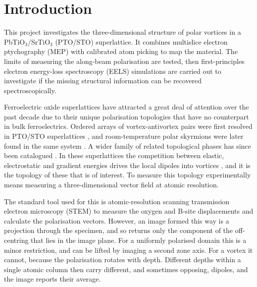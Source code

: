 \documentclass[aps,prb,twocolumn,superscriptaddress,floatfix,nofootinbib]{revtex4-2}
\begin{document}
\section{Introduction}

This project investigates the three-dimensional structure of polar vortices in a PbTiO$_3$/SrTiO$_3$ (PTO/STO) superlattice. It combines multislice electron ptychography (MEP) with calibrated atom picking to map the material. The limits of measuring the along-beam polarisation are tested, then first-principles electron energy-loss spectroscopy (EELS) simulations are carried out to investigate if the missing structural information can be recovered spectroscopically.

Ferroelectric oxide superlattices have attracted a great deal of attention over the past decade due to their unique polarisation topologies that have no counterpart in bulk ferroelectrics. Ordered arrays of vortex-antivortex pairs were first resolved in PTO/STO superlattices \citep{Yadav2016}, and room-temperature polar skyrmions were later found in the same system \citep{Das2019}. A wider family of related topological phases has since been catalogued \citep{Junquera2023}. In these superlattices the competition between elastic, electrostatic and gradient energies drives the local dipoles into vortices \citep{Junquera2023}, and it is the topology of these that is of interest. To measure this topology experimentally means measuring a three-dimensional vector field at atomic resolution.

The standard tool used for this is atomic-resolution scanning transmission electron microscopy (STEM) to measure the oxygen and B-site displacements and calculate the polarisation vectors. However, an image formed this way is a projection through the specimen, and so returns only the component of the off-centring that lies in the image plane. For a uniformly polarised domain this is a minor restriction, and can be lifted by imaging a second zone axis. For a vortex it cannot, because the polarisation rotates with depth. Different depths within a single atomic column then carry different, and sometimes opposing, dipoles, and the image reports their average. 
\end{document}
